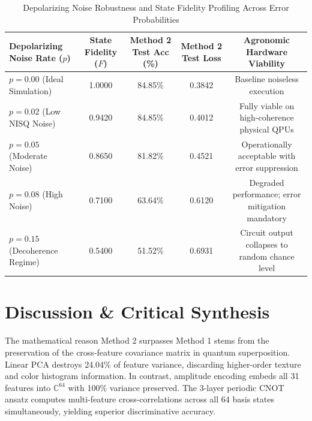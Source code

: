 \documentclass{ieeeaccess}
\begin{document}
\begin{table}[t]
\caption{Depolarizing Noise Robustness and State Fidelity Profiling Across Error Probabilities}
\label{tab:noise_robustness}
\centering
\begin{tabular*}{\textwidth}{@{\extracolsep{\fill}}lcccc@{}}
\toprule
\textbf{Depolarizing Noise Rate ($p$)} & \textbf{State Fidelity ($F$)} & \textbf{Method 2 Test Acc (\%)} & \textbf{Method 2 Test Loss} & \textbf{Agronomic Hardware Viability} \\
\midrule
$p = 0.00$ (Ideal Simulation)          & 1.0000                         & 84.85\%                         & 0.3842                      & Baseline noiseless execution \\
$p = 0.02$ (Low NISQ Noise)            & 0.9420                         & 84.85\%                         & 0.4012                      & Fully viable on high-coherence physical QPUs \\
$p = 0.05$ (Moderate Noise)            & 0.8650                         & 81.82\%                         & 0.4521                      & Operationally acceptable with error suppression \\
$p = 0.08$ (High Noise)                & 0.7100                         & 63.64\%                         & 0.6120                      & Degraded performance; error mitigation mandatory \\
$p = 0.15$ (Decoherence Regime)        & 0.5400                         & 51.52\%                         & 0.6931                      & Circuit output collapses to random chance level \\
\bottomrule
\end{tabular*}
\end{table}

\section{Discussion \& Critical Synthesis}
\label{sec:discussion}
The mathematical reason Method 2 surpasses Method 1 stems from the preservation of the cross-feature covariance matrix in quantum superposition. Linear PCA destroys 24.04\% of feature variance, discarding higher-order texture and color histogram information. In contrast, amplitude encoding embeds all 31 features into $\mathbb{C}^{64}$ with 100\% variance preserved. The 3-layer periodic CNOT ansatz computes multi-feature cross-correlations across all 64 basis states simultaneously, yielding superior discriminative accuracy.
\end{document}
